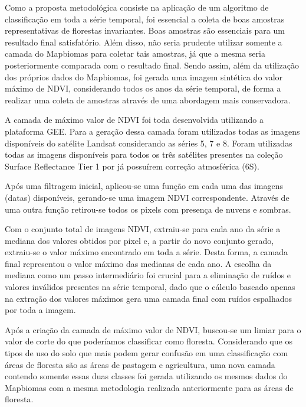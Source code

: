 Como a proposta metodológica consiste na aplicação de um algoritmo de classificação em toda a série temporal, foi essencial a coleta de boas amostras representativas de florestas invariantes. Boas amostras são essenciais para um resultado final satisfatório. Além disso, não seria prudente utilizar somente a camada do Mapbiomas para coletar tais amostras, já que a mesma seria posteriormente comparada com o resultado final. Sendo assim, além da utilização dos próprios dados do Mapbiomas, foi gerada uma imagem sintética do valor máximo de NDVI, considerando todos os anos da série temporal, de forma a realizar uma coleta de amostras através de uma abordagem mais conservadora.

A camada de máximo valor de NDVI foi toda desenvolvida utilizando a plataforma GEE. Para a geração dessa camada foram utilizadas todas as imagens disponíveis do satélite Landsat considerando as séries 5, 7 e 8. Foram utilizadas todas as imagens disponíveis para todos os três satélites presentes na coleção Surface Reflectance Tier 1 por já possuírem correção atmosférica (6S).

Após uma filtragem inicial, aplicou-se uma função em cada uma das imagens (datas) disponíveis, gerando-se uma imagem NDVI correspondente. Através de uma outra função retirou-se todos os pixels com presença de nuvens e sombras.

Com o conjunto total de imagens NDVI, extraiu-se para cada ano da série a mediana dos valores obtidos por pixel e, a partir do novo conjunto gerado, extraiu-se o valor máximo encontrado em toda a série. Desta forma, a camada final representou o valor máximo das medianas de cada ano. A escolha da mediana como um passo intermediário foi crucial para a eliminação de ruídos e valores inválidos presentes na série temporal, dado que o cálculo baseado apenas na extração dos valores máximos gera uma camada final com ruídos espalhados por toda a imagem.

Após a criação da camada de máximo valor de NDVI, buscou-se um limiar para o valor de corte do que poderíamos classificar como floresta. Considerando que os tipos de uso do solo que mais podem gerar confusão em uma classificação com áreas de floresta são as áreas de pastagem e agricultura, uma nova camada contendo somente essas duas classes foi gerada utilizando os mesmos dados do Mapbiomas com a mesma metodologia realizada anteriormente para as áreas de floresta.

